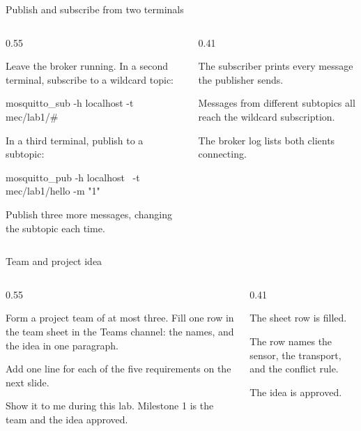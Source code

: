 \documentclass[10pt,aspectratio=169,t]{beamer}
\begin{document}
\begin{frame}[fragile,eyebrow=Task IV]{Publish and subscribe from two terminals}
  \begin{columns}[T]
    \begin{column}{0.55\textwidth}
      \begin{steps}
        \item Leave the broker running. In a second terminal, subscribe to a wildcard topic:
\begin{shell}
mosquitto_sub -h localhost -t mec/lab1/#
\end{shell}
        \item In a third terminal, publish to a subtopic:
\begin{shell}
mosquitto_pub -h localhost \
  -t mec/lab1/hello -m "1"
\end{shell}
        \item Publish three more messages, changing the subtopic each time.
      \end{steps}
    \end{column}
    \begin{column}{0.41\textwidth}
      \begin{checklist}
        \item The subscriber prints every message the publisher sends.
        \item Messages from different subtopics all reach the wildcard subscription.
        \item The broker log lists both clients connecting.
      \end{checklist}
    \end{column}
  \end{columns}
\end{frame}

\begin{frame}[eyebrow=Task V]{Team and project idea}
  \begin{columns}[T]
    \begin{column}{0.55\textwidth}
      \begin{steps}
        \item Form a project team of at most three. Fill one row in the team sheet in the Teams channel: the names, and the idea in one paragraph.
        \item Add one line for each of the five requirements on the next slide.
        \item Show it to me during this lab. Milestone 1 is the team and the idea approved.
      \end{steps}
    \end{column}
    \begin{column}{0.41\textwidth}
      \begin{checklist}
        \item The sheet row is filled.
        \item The row names the sensor, the transport, and the conflict rule.
        \item The idea is approved.
      \end{checklist}
    \end{column}
  \end{columns}
\end{frame}
\end{document}
